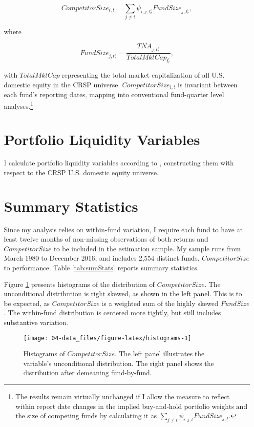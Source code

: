 \documentclass[openany]{book}
\let\rmarkdownfootnote\footnote%
\def\footnote{\protect\rmarkdownfootnote}
\theoremstyle{definition}
\theoremstyle{definition}
\theoremstyle{definition}
\theoremstyle{remark}
\begin{document}
\begin{equation}
CompetitorSize_{i,t} = \sum_{j\neq i} \psi_{i,j,t^i_r} FundSize_{j,t^i_r},
\end{equation}

where

\begin{equation}
FundSize_{j,t^i_r}=\frac{TNA_{j,t^i_r}}{TotalMktCap_{t^i_r}},
\end{equation}

with \(TotalMktCap\) representing the total market capitalization of all
U.S. domestic equity in the CRSP universe. \(CompetitorSize_{i,t}\) is
invariant between each fund's reporting dates, mapping into conventional
fund-quarter level analyses.\footnote{The results remain virtually
  unchanged if I allow the measure to reflect within report date changes
  in the implied buy-and-hold portfolio weights and the size of
  competing funds by calculating it as
  \(\sum_{j\neq i}\psi_{i,j,t} FundSize_{j,t}\).}

\section{Portfolio Liquidity
Variables}\label{portfolio-liquidity-variables}

I calculate portfolio liquidity variables according to \citet{pst17L},
constructing them with respect to the CRSP U.S. domestic equity
universe.

\section{Summary Statistics}\label{sec:sumStats}

Since my analysis relies on within-fund variation, I require each fund
to have at least twelve months of non-missing observations of both
returns and \(CompetitorSize\) to be included in the estimation sample.
My sample runs from March 1980 to December 2016, and includes 2,554
distinct funds. \(CompetitorSize\) to performance. Table
\ref{tab:sumStats} reports summary statistics.

Figure \ref{fig:histograms} presents histograms of the distribution of
\(CompetitorSize\). The unconditional distribution is right skewed, as
shown in the left panel. This is to be expected, as \(CompetitorSize\)
is a weighted sum of the highly skewed \(FundSize\). The within-fund
distribution is centered more tightly, but still includes substantive
variation.

\begin{figure}

{\centering \texttt{[image: 04-data\_files/figure-latex/histograms-1]} 

}

\caption{Histograms of $CompetitorSize$. The left panel illustrates the variable's unconditional distribution. The right panel shows the distribution after demeaning fund-by-fund.}\label{fig:histograms}
\end{figure}
\end{document}
